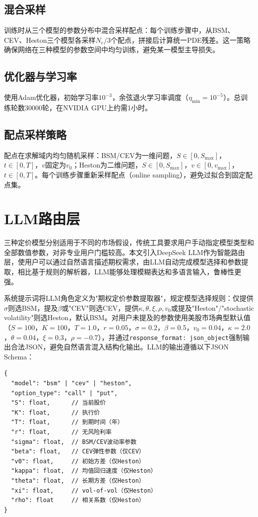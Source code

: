 \subsection{混合采样}

训练时从三个模型的参数分布中混合采样配点：每个训练步骤中，从BSM、CEV、Heston三个模型各采样$N_c/3$个配点，拼接后计算统一PDE残差。这一策略确保网络在三种模型的参数空间中均匀训练，避免某一模型主导损失。

\subsection{优化器与学习率}

使用Adam优化器\cite{kingma2014adam}，初始学习率$10^{-3}$，余弦退火学习率调度（$\eta_\text{min}=10^{-5}$）。总训练轮数30000轮，在NVIDIA GPU上约需1小时。

\subsection{配点采样策略}

配点在求解域内均匀随机采样：BSM/CEV为一维问题，$S\in[0, S_\text{max}]$，$t\in[0,T]$，$v$固定为$v_0$；Heston为二维问题，$S\in[0, S_\text{max}]$，$v\in[0, v_\text{max}]$，$t\in[0,T]$。每个训练步骤重新采样配点（online sampling），避免过拟合到固定配点集。

\section{LLM路由层}\label{sec:llm_router}

三种定价模型分别适用于不同的市场假设，传统工具要求用户手动指定模型类型和全部数值参数，对非专业用户门槛较高。本文引入DeepSeek LLM作为智能路由层，使用户可以通过自然语言描述期权需求，由LLM自动完成模型选择和参数提取，相比基于规则的解析器，LLM能够处理模糊表达和多语言输入，鲁棒性更强。

系统提示词将LLM角色定义为"期权定价参数提取器"，规定模型选择规则：仅提供$\sigma$则选BSM，提及$\beta$或"CEV"则选CEV，提供$\kappa,\theta,\xi,\rho,v_0$或提及"Heston"/"stochastic volatility"则选Heston，默认BSM。对用户未提及的参数使用美股市场典型默认值（$S=100$，$K=100$，$T=1.0$，$r=0.05$，$\sigma=0.2$，$\beta=0.5$，$v_0=0.04$，$\kappa=2.0$，$\theta=0.04$，$\xi=0.3$，$\rho=-0.7$），并通过\texttt{response\_format: json\_object}强制输出合法JSON，避免自然语言混入结构化输出。LLM的输出遵循以下JSON Schema：
\begin{verbatim}
{
  "model": "bsm" | "cev" | "heston",
  "option_type": "call" | "put",
  "S": float,      // 当前股价
  "K": float,      // 执行价
  "T": float,      // 到期时间（年）
  "r": float,      // 无风险利率
  "sigma": float,  // BSM/CEV波动率参数
  "beta": float,   // CEV弹性参数（仅CEV）
  "v0": float,     // 初始方差（仅Heston）
  "kappa": float,  // 均值回归速度（仅Heston）
  "theta": float,  // 长期方差（仅Heston）
  "xi": float,     // vol-of-vol（仅Heston）
  "rho": float     // 相关系数（仅Heston）
}
\end{verbatim}

